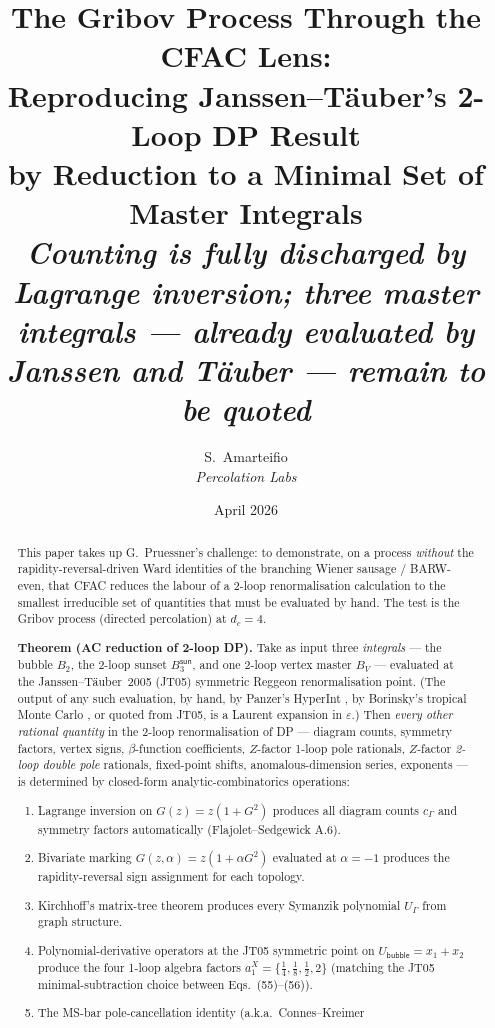 \documentclass[11pt,a4paper]{article}
\title{%
  The Gribov Process Through the CFAC Lens:\\[4pt]
  \large Reproducing Janssen--T\"auber's 2-Loop DP Result\\
  by Reduction to a Minimal Set of Master Integrals\\[6pt]
  \normalsize\textit{Counting is fully discharged by Lagrange inversion;
  three master integrals --- already evaluated by Janssen and T\"auber ---
  remain to be quoted}}
\author{S.\ Amarteifio \\
        \small\textit{Percolation Labs}}
\date{April 2026}
\theoremstyle{definition}
\theoremstyle{plain}
\begin{document}
\maketitle

\begin{abstract}
This paper takes up G.~Pruessner's challenge: to demonstrate, on a
process \emph{without} the rapidity-reversal-driven Ward identities
of the branching Wiener sausage / BARW-even, that CFAC reduces the
labour of a 2-loop renormalisation calculation to the smallest
irreducible set of quantities that must be evaluated by hand.  The
test is the Gribov process (directed percolation) at $d_c = 4$.

\textbf{Theorem (AC reduction of 2-loop DP).}  Take as input three
\emph{integrals} --- the bubble $B_2$, the 2-loop sunset
$B_3^{\textsf{sun}}$, and one 2-loop vertex master $B_V$ ---
evaluated at the Janssen--T\"auber~2005 (JT05) \cite{JanssenTauber2005}
symmetric Reggeon renormalisation point.  (The output of any such
evaluation, by hand, by Panzer's HyperInt \cite{Panzer2014}, by
Borinsky's tropical Monte Carlo \cite{Borinsky2020}, or quoted from
JT05, is a Laurent expansion in $\varepsilon$.)  Then \emph{every
other rational quantity} in the 2-loop renormalisation of DP ---
diagram counts,
symmetry factors, vertex signs, $\beta$-function coefficients,
$Z$-factor 1-loop pole rationals, $Z$-factor \emph{2-loop double
pole} rationals, fixed-point shifts, anomalous-dimension series,
exponents --- is determined by closed-form analytic-combinatorics
operations:
\begin{enumerate}[leftmargin=2em,label=(\textsf{C\arabic*})]
  \item Lagrange inversion on $G(z) = z(1 + G^2)$ produces all
    diagram counts $c_\Gamma$ and symmetry factors automatically
    (Flajolet--Sedgewick A.6).
  \item Bivariate marking $G(z, \alpha) = z(1 + \alpha G^2)$
    evaluated at $\alpha = -1$ produces the rapidity-reversal sign
    assignment for each topology.
  \item Kirchhoff's matrix-tree theorem produces every Symanzik
    polynomial $U_\Gamma$ from graph structure.
  \item Polynomial-derivative operators at the JT05 symmetric point
    on $U_{\textsf{bubble}} = x_1 + x_2$ produce the four 1-loop
    algebra factors $a^X_1 = \{\tfrac14, \tfrac18, \tfrac12, 2\}$
    (matching the JT05 minimal-subtraction choice between
    Eqs.~(55)--(56)).
  \item The MS-bar pole-cancellation identity (a.k.a.\ Connes--Kreimer

\end{enumerate}
\end{abstract}
\end{document}

